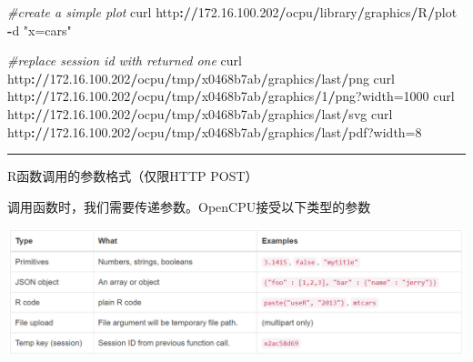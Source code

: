 \documentclass[]{book}
\newenvironment{Shaded}{\begin{snugshade}}{\end{snugshade}}
\newcommand{\DecValTok}[1]{\textcolor[rgb]{0.00,0.00,0.81}{#1}}
\newcommand{\FloatTok}[1]{\textcolor[rgb]{0.00,0.00,0.81}{#1}}
\newcommand{\StringTok}[1]{\textcolor[rgb]{0.31,0.60,0.02}{#1}}
\newcommand{\CommentTok}[1]{\textcolor[rgb]{0.56,0.35,0.01}{\textit{#1}}}
\newcommand{\OperatorTok}[1]{\textcolor[rgb]{0.81,0.36,0.00}{\textbf{#1}}}
\newcommand{\ErrorTok}[1]{\textcolor[rgb]{0.64,0.00,0.00}{\textbf{#1}}}
\newcommand{\NormalTok}[1]{#1}
\begin{document}
\begin{Shaded}
\begin{Highlighting}[]
\CommentTok{#create a simple plot}
\NormalTok{curl http}\OperatorTok{:}\ErrorTok{//}\FloatTok{172.16}\NormalTok{.}\FloatTok{100.202}\OperatorTok{/}\NormalTok{ocpu}\OperatorTok{/}\NormalTok{library}\OperatorTok{/}\NormalTok{graphics}\OperatorTok{/}\NormalTok{R}\OperatorTok{/}\NormalTok{plot }\OperatorTok{-}\NormalTok{d }\StringTok{"x=cars"}

\CommentTok{#replace session id with returned one}
\NormalTok{curl http}\OperatorTok{:}\ErrorTok{//}\FloatTok{172.16}\NormalTok{.}\FloatTok{100.202}\OperatorTok{/}\NormalTok{ocpu}\OperatorTok{/}\NormalTok{tmp}\OperatorTok{/}\NormalTok{x0468b7ab}\OperatorTok{/}\NormalTok{graphics}\OperatorTok{/}\NormalTok{last}\OperatorTok{/}\NormalTok{png}
\NormalTok{curl http}\OperatorTok{:}\ErrorTok{//}\FloatTok{172.16}\NormalTok{.}\FloatTok{100.202}\OperatorTok{/}\NormalTok{ocpu}\OperatorTok{/}\NormalTok{tmp}\OperatorTok{/}\NormalTok{x0468b7ab}\OperatorTok{/}\NormalTok{graphics}\OperatorTok{/}\DecValTok{1}\OperatorTok{/}\NormalTok{png?width=}\DecValTok{1000}
\NormalTok{curl http}\OperatorTok{:}\ErrorTok{//}\FloatTok{172.16}\NormalTok{.}\FloatTok{100.202}\OperatorTok{/}\NormalTok{ocpu}\OperatorTok{/}\NormalTok{tmp}\OperatorTok{/}\NormalTok{x0468b7ab}\OperatorTok{/}\NormalTok{graphics}\OperatorTok{/}\NormalTok{last}\OperatorTok{/}\NormalTok{svg}
\NormalTok{curl http}\OperatorTok{:}\ErrorTok{//}\FloatTok{172.16}\NormalTok{.}\FloatTok{100.202}\OperatorTok{/}\NormalTok{ocpu}\OperatorTok{/}\NormalTok{tmp}\OperatorTok{/}\NormalTok{x0468b7ab}\OperatorTok{/}\NormalTok{graphics}\OperatorTok{/}\NormalTok{last}\OperatorTok{/}\NormalTok{pdf?width=}\DecValTok{8}
\end{Highlighting}
\end{Shaded}

\begin{center}\rule{0.5\linewidth}{\linethickness}\end{center}

R函数调用的参数格式（仅限HTTP POST）

调用函数时，我们需要传递参数。OpenCPU接受以下类型的参数

\includegraphics{pic/opencpu/p8.png}
\end{document}
